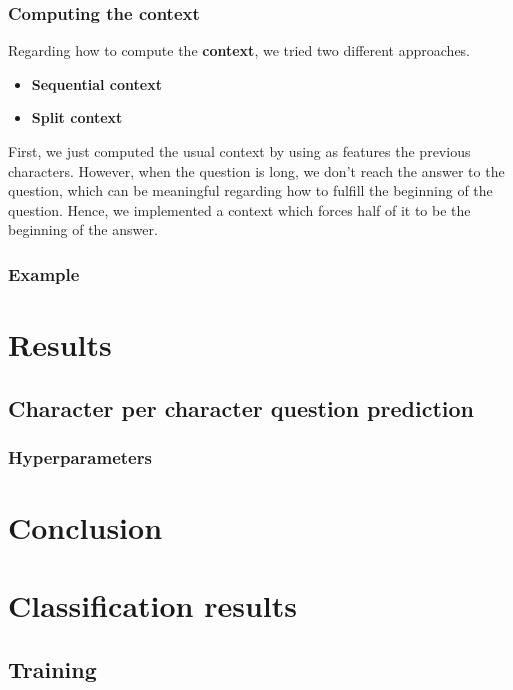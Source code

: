 \documentclass{article}
\begin{document}
\subsubsection{Computing the context}

Regarding how to compute the \textbf{context}, we tried two different approaches. 

\begin{itemize}
    \item \textbf{Sequential context}
    \item \textbf{Split context}
\end{itemize}

First, we just computed the usual context by using as features the previous characters. However, when the question is long, we don't reach the answer to the question, which can be meaningful regarding how to fulfill the beginning of the question. Hence, we implemented a context which forces half of it to be the beginning of the answer.
\newline \newline

\subsubsection{Example}

\section{Results}

\subsection{Character per character question prediction}

\subsubsection{Hyperparameters}

\section{Conclusion}

\medskip

\newpage

\printbibliography

\newpage

\appendix

\section{Classification results}

\subsection{Training}
\end{document}
